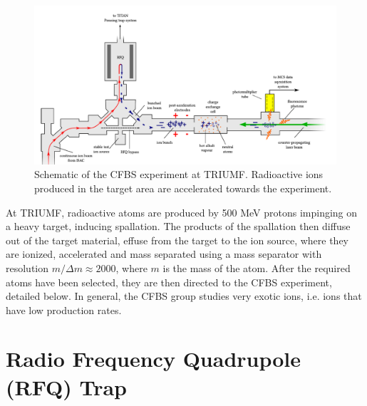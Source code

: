 \begin{figure}[h]
\includegraphics[width=\textwidth]{Laser_spec_triumf/experiment.png}
\caption[Schematic of the CFBS experiment at TRIUMF]{\small Schematic of the CFBS experiment at TRIUMF. Radioactive ions produced in the target area are accelerated towards the experiment\cite{CFBS}.}
\label{exp}
\end{figure}

At TRIUMF, radioactive atoms are produced by 500 MeV protons impinging on a heavy target, inducing spallation. The products of the spallation then diffuse out of the target material, effuse from the target to the ion source, where they are ionized, accelerated and mass separated using a mass separator with resolution $m/\Delta m \approx 2000$, where $m$ is the mass of the atom\cite{CFBS}. After the required atoms have been selected, they are then directed to the CFBS experiment, detailed below. In general, the CFBS group studies very exotic ions, i.e. ions that have low production rates.

\section{Radio Frequency Quadrupole (RFQ) Trap}

